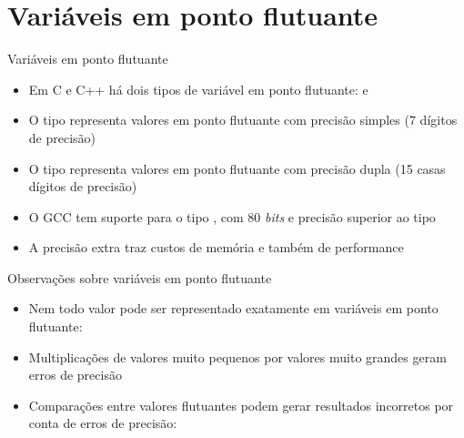 \section{Variáveis em ponto flutuante}

\begin{frame}[fragile]{Variáveis em ponto flutuante}

    \begin{itemize}
        \item Em C e C++ há dois tipos de variável em ponto flutuante:  e

        \item O tipo  representa valores em ponto flutuante com precisão
            simples (7 dígitos de precisão)

        \item O tipo  representa valores em ponto flutuante com precisão
            dupla (15 casas dígitos de precisão)

        \item O GCC tem suporte para o tipo , com 80 \textit{bits} e 
            precisão superior ao tipo 

        \item A precisão extra traz custos de memória e também de performance

    \end{itemize}

\end{frame}

\begin{frame}[fragile]{Observações sobre variáveis em ponto flutuante}

    \begin{itemize}
        \item Nem todo valor pode ser representado exatamente em variáveis em ponto
            flutuante:

        \item Multiplicações de valores muito pequenos por valores muito grandes geram erros
            de precisão

        \item Comparações entre valores flutuantes podem gerar resultados incorretos por conta
            de erros de precisão:

    \end{itemize}

\end{frame}

